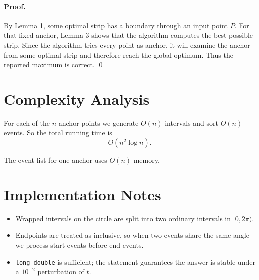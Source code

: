 \documentclass[11pt]{article}
\begin{document}
\paragraph{Proof.}
By Lemma 1, some optimal strip has a boundary through an input point $P$.
For that fixed anchor, Lemma 3 shows that the algorithm computes the best possible strip.
Since the algorithm tries every point as anchor, it will examine the anchor from some optimal strip and
therefore reach the global optimum.
Thus the reported maximum is correct. \qed

\section*{Complexity Analysis}

For each of the $n$ anchor points we generate $O(n)$ intervals and sort $O(n)$ events.
So the total running time is
\[
    O(n^2 \log n).
\]

The event list for one anchor uses $O(n)$ memory.

\section*{Implementation Notes}

\begin{itemize}[leftmargin=*]
    \item Wrapped intervals on the circle are split into two ordinary intervals in $[0,2\pi)$.
    \item Endpoints are treated as inclusive, so when two events share the same angle we process start events
    before end events.
    \item \texttt{long double} is sufficient; the statement guarantees the answer is stable under a
    $10^{-2}$ perturbation of $t$.
\end{itemize}
\end{document}
